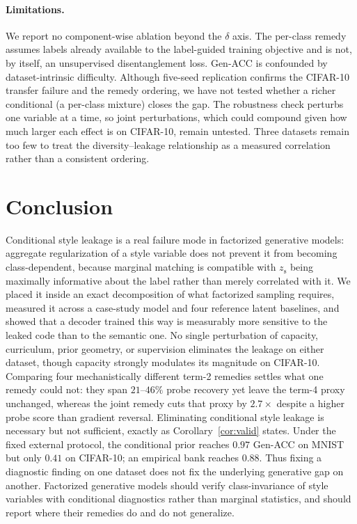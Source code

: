 \documentclass[letterpaper]{article} %
\newcommand{\zs}{z_{\mathrm{s}}}
\begin{document}
\paragraph{Limitations.}
We report no component-wise ablation beyond the $\delta$ axis. The per-class remedy
assumes labels already available to the label-guided training objective and
is not, by itself, an unsupervised disentanglement loss. Gen-ACC is
confounded by dataset-intrinsic difficulty. Although five-seed replication
confirms the CIFAR-10 transfer failure and the remedy ordering, we have not
tested whether a richer conditional (a per-class mixture) closes the gap.
The robustness check
perturbs one variable at a time, so joint perturbations, which could compound
given how much larger each effect is on CIFAR-10, remain untested.
{Three datasets remain too few to treat the
diversity--leakage relationship as a measured correlation rather than a
consistent ordering.}

\section{Conclusion}

Conditional style leakage is a real failure mode in factorized generative
models: aggregate regularization of a style variable does not prevent it from
becoming class-dependent, because marginal matching is compatible with $\zs$
being maximally informative about the label rather than merely correlated
with it. We placed it inside an exact decomposition of what factorized
sampling requires, measured it across a case-study model and four reference
latent baselines, and showed that a decoder trained this way is measurably
more sensitive to the leaked code than
to the semantic one. No single perturbation of capacity, curriculum, prior
geometry, or supervision eliminates the leakage on either dataset, though
capacity strongly modulates its magnitude on CIFAR-10. {Comparing four
mechanistically different term-2 remedies settles what one remedy could not:
they span $21$--$46\%$ probe recovery yet leave the term-4 proxy unchanged,
whereas the joint remedy cuts that proxy by $2.7\times$ despite a higher
probe score than gradient reversal. Eliminating conditional style leakage is
necessary but not sufficient, exactly as Corollary~\ref{cor:valid} states.}
Under the fixed external protocol, the conditional prior reaches $0.97$
Gen-ACC on MNIST but only $0.41$ on CIFAR-10; an empirical bank reaches
$0.88$. Thus fixing a diagnostic finding on one dataset does not fix the
underlying generative gap on another. Factorized generative models should
verify class-invariance of style variables with conditional diagnostics
rather than marginal statistics, and should report where their remedies do
and do not generalize.


\end{document}

